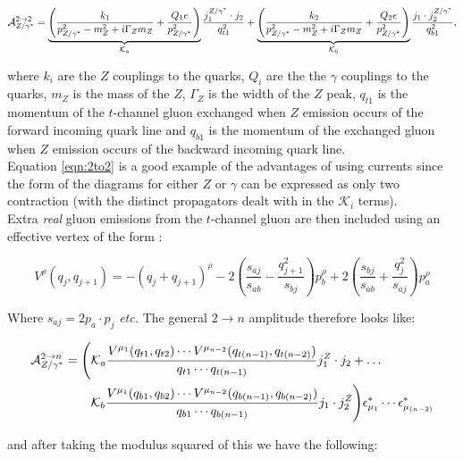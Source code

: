 		\begin{equation}
		\mathcal{A}_{Z/\gamma^*}^{2\rightarrow 2} =\underbrace{\left(\frac{k_1}{p_{Z/\gamma^*}^2 - m^2_Z + i\Gamma_Zm_Z} + \frac{Q_1e}{p_{Z/\gamma^*}^2}\right)}_{\mathcal{K}_a}\frac{j^{Z/\gamma^*}_1\cdot j_2}{q_{t1}^2} + \underbrace{\left(\frac{k_2}{p_{Z/\gamma^*}^2 - m^2_Z + i\Gamma_Zm_Z} + \frac{Q_2e}{p_{Z/\gamma^*}^2}\right)}_{\mathcal{K}_b}\frac{j_1\cdot j^{Z/\gamma^*}_2}{	q_{	b1}^2},
		\label{eqn:2to2}
		\end{equation}

		where $k_i$ are the $Z$ couplings to the quarks, $Q_i$ are the the $\gamma$ couplings to the quarks, $m_Z$ is the mass of the $Z$, $\Gamma_Z$ is the width of the $Z$ peak, $q_{t1}$ is the momentum of the $t$-channel gluon exchanged when $Z$ emission occurs of the forward incoming quark line and $q_{b1}$ is 	the momentum of the exchanged gluon when $Z$ emission occurs of the backward incoming quark line.\\Equation \ref{eqn:2to2} is a good example of the advantages of using currents since the form of the diagrams for either $Z$ or $\gamma$ can be expressed as only two contraction (with the distinct propagators 	dealt with in the $\mathcal{K}_i$ terms).\\Extra \emph{real} gluon emissions from the $t$-channel gluon are then included using an effective vertex of the form \cite{JeppeHiggs}\cite{Constructing}:

		\begin{equation}
		V^\rho(q_j, q_{j+1}) = -(q_j + q_{j+1})^\rho - 2\left(\frac{s_{aj}}{s_{ab}} - \frac{q^2_{j+1}}{s_{bj}}\right)p_b^\rho + 2\left(\frac{s_{bj}}{s_{ab}} + \frac{q_j^2}{s_{aj}}\right)p_a^\rho
		\label{eqn:effectivevertex}
		\end{equation}

		Where $s_{aj} = 2p_a\cdot p_j$ \emph{etc.}  The general $2\rightarrow n$ amplitude therefore looks like:

		\begin{align}
		\mathcal{A}^{2\rightarrow n}_{Z/\gamma^*} = \Bigg(&\mathcal{K}_a\frac{V^{\mu_1}(q_{t1}, q_{t2})\cdots V^{\mu_{n-2}}(q_{t(n-1)}, q_{t(n-2)})} {q_{t1}\cdots q_{t(n-1)}} j_1^Z\cdot j_2 +\ldots\\  \nonumber
		&\mathcal{K}_b\frac{V^{\mu_1}(q_{b1}, q_{b2})\cdots V^{\mu_{n-2}}(q_{b(n-1)}, q_{b(n-2)})} {q_{b1}\cdots q_{b(n-1)}} j_1  \cdot j_2^Z\Bigg)\epsilon^*_{\mu_1}\cdots\epsilon^*_{\mu_{(n-2)}}
		\end{align}

		and after taking the modulus squared of this we have the following:

